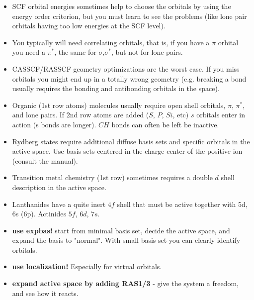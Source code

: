 \begin{itemize}
\item SCF orbital energies sometimes help to choose the orbitals by using the energy order 
criterion, but you must learn to see the problems (like lone pair orbitals having too low 
energies at the SCF level). 
\item You typically will need correlating orbitals, that is, if you have a $\pi$ orbital you need a $\pi^*$, 
the same for $\sigma$,$\sigma^*$, but not for lone pairs. 
\item CASSCF/RASSCF geometry optimizations are the worst case. If you miss orbitals you 
might end up in a totally wrong geometry (e.g. breaking a bond usually requires the 
bonding and antibonding orbitals in the space). 
\item 
Organic (1st row atoms) molecules usually require open shell orbitals, 
$\pi$, $\pi^*$, and lone 
pairs. If 2nd row atoms are added ($S$, $P$, $Si$, etc) $s$ orbitals enter in action (s bonds are 
longer). $CH$ bonds can often be left be inactive. 


\item Rydberg states require additional diffuse basis sets and specific orbitals in the active 
space. Use basis sets centered in the charge center of the positive ion 
(consult the manual). 
\item Transition metal chemistry (1st row) sometimes requires a double $d$ shell description 
in the active space. 
\item Lanthanides have a quite inert $4f$ shell that must be active together with 5d, 6s (6p). 
Actinides $5f$, $6d$, $7s$. 
%
\end{itemize}

\begin{itemize}
\item {\bf use expbas!} start from minimal basis set, decide the active
space, and expand the basis to "normal". With small basis set you can 
clearly identify orbitals. 

\item {\bf use localization!} Especially for virtual orbitals.

\item {\bf expand active space by adding RAS1/3} - give the system a freedom, and see how it 
reacts.
\end{itemize}

